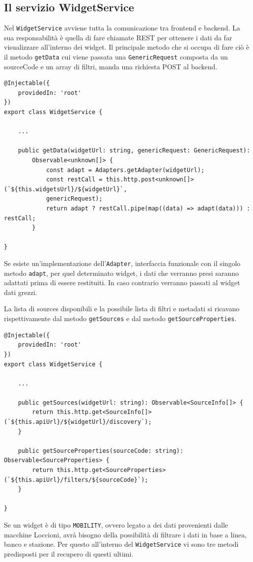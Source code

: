 \subsection{Il servizio WidgetService}
Nel \verb|WidgetService| avviene tutta la comunicazione tra frontend e backend.
La sua responsabilità è quella di fare chiamate REST per ottenere i dati da far visualizzare all'interno dei widget. Il principale metodo che si occupa di fare ciò è il metodo \verb|getData| cui viene passata una \verb|GenericRequest| composta da un sourceCode e un array di filtri, manda una richiesta POST al backend.

\begin{lstlisting}[caption={Metodo getData all'interno della classe WidgetService}, style=javaScriptCode]
@Injectable({
    providedIn: 'root'
})
export class WidgetService {

    ...

    public getData(widgetUrl: string, genericRequest: GenericRequest): 
        Observable<unknown[]> {
            const adapt = Adapters.getAdapter(widgetUrl);
            const restCall = this.http.post<unknown[]>(`${this.widgetsUrl}/${widgetUrl}`, 
            genericRequest);
            return adapt ? restCall.pipe(map((data) => adapt(data))) : restCall;
        }

}

\end{lstlisting}
Se esiste un'implementazione dell'\verb|Adapter|, interfaccia funzionale con il singolo metodo \verb|adapt|, per quel determinato widget, i dati che verranno presi saranno adattati prima di essere restituiti. In caso contrario verranno passati al widget dati grezzi.

La lista di sources disponibili e la possibile lista di filtri e metadati si ricavano rispettivamente dal metodo \verb|getSources| e dal metodo \verb|getSourceProperties|.

\begin{lstlisting}[caption={Metodi getSources e getSourceProperties all'interno della classe WidgetService}, style=javaScriptCode]
@Injectable({
    providedIn: 'root'
})
export class WidgetService {

    ...
        
    public getSources(widgetUrl: string): Observable<SourceInfo[]> {
        return this.http.get<SourceInfo[]>(`${this.apiUrl}/${widgetUrl}/discovery`);
    }

    public getSourceProperties(sourceCode: string): Observable<SourceProperties> {
        return this.http.get<SourceProperties>(`${this.apiUrl}/filters/${sourceCode}`);
    }

}
\end{lstlisting}
Se un widget è di tipo \verb|MOBILITY|, ovvero legato a dei dati provenienti dalle macchine Loccioni, avrà bisogno della possibilità di filtrare i dati in base a linea, banco e stazione. Per questo all'interno del \verb|WidgetService| vi sono tre metodi predisposti per il recupero di questi ultimi.

